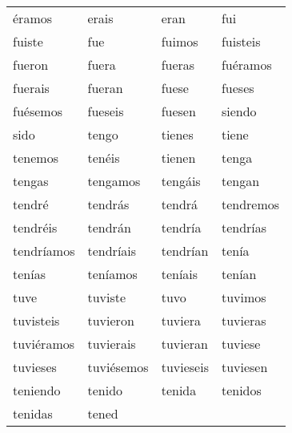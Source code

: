\begin{table}
\begin{tabular}{l l l l}
	
 \'eramos &
	 erais &
	 eran &
	 fui \\
	 fuiste &
	 fue &
	 fuimos &
	 fuisteis \\
	 fueron &
	 fuera &
	 fueras &
	 fu\'eramos \\
	 fuerais &
	 fueran &
	 fuese &
	 fueses \\
	 fu\'esemos &
	 fueseis &
	 fuesen &
	 siendo \\
	 sido &
	 tengo &
	 tienes &
	 tiene \\
	 tenemos &
	 ten\'eis &
	 tienen &
	 tenga \\
	 tengas &
	 tengamos &
	 teng\'ais &
	 tengan \\
	 tendr\'e &
	 tendr\'as &
	 tendr\'a &
	 tendremos \\
	 tendr\'eis &
	 tendr\'an &
	 tendr\'ia &
	 tendr\'ias \\
	 tendr\'iamos &
	 tendr\'iais &
	 tendr\'ian &
	 ten\'ia \\
	 ten\'ias &
	 ten\'iamos &
	 ten\'iais &
	 ten\'ian \\
	 tuve &
	 tuviste &
	 tuvo & 
	 tuvimos \\
	 tuvisteis &
	 tuvieron &
	 tuviera &
	 tuvieras \\
	 tuvi\'eramos &
	 tuvierais &
	 tuvieran &
	 tuviese \\
	 tuvieses &
	 tuvi\'esemos &
	 tuvieseis &
	 tuviesen \\
	 teniendo &
	 tenido &
	 tenida &
	 tenidos \\
	 tenidas &
	 tened & & \\	
	
	
	\end{tabular}
	
	
	\end{table}
	
	
